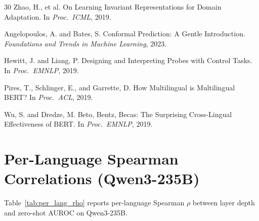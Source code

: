 \documentclass[11pt,a4paper]{article}
\begin{document}
\begin{thebibliography}{30}
Zhao, H., et al.
\newblock On Learning Invariant Representations for Domain Adaptation.
\newblock In \emph{Proc.\ ICML}, 2019.

Angelopoulos, A. and Bates, S.
\newblock Conformal Prediction: A Gentle Introduction.
\newblock \emph{Foundations and Trends in Machine Learning}, 2023.

Hewitt, J. and Liang, P.
\newblock Designing and Interpreting Probes with Control Tasks.
\newblock In \emph{Proc.\ EMNLP}, 2019.

Pires, T., Schlinger, E., and Garrette, D.
\newblock How Multilingual is Multilingual BERT?
\newblock In \emph{Proc.\ ACL}, 2019.

Wu, S. and Dredze, M.
\newblock Beto, Bentz, Becas: The Surprising Cross-Lingual Effectiveness of BERT.
\newblock In \emph{Proc.\ EMNLP}, 2019.

\end{thebibliography}

\appendix
\section{Per-Language Spearman Correlations (Qwen3-235B)}
\label{app:per_lang}

Table~\ref{tab:per_lang_rho} reports per-language Spearman $\rho$ between layer depth and zero-shot AUROC on Qwen3-235B.
\end{document}
